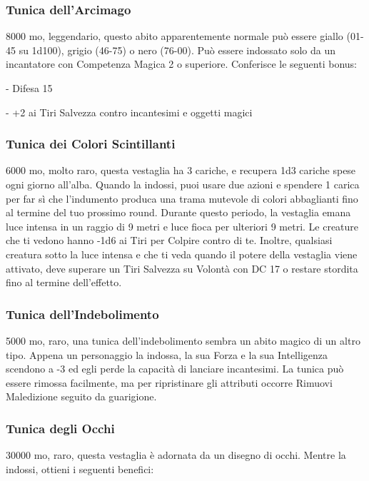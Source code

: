 \begin{multicols}{2}
\subsubsection*{Tunica dell’Arcimago}
8000 mo, leggendario, questo abito apparentemente normale può essere giallo (01-45 su 1d100), grigio (46-75) o nero (76-00). Può essere indossato solo da un incantatore con Competenza Magica 2 o superiore. Conferisce le seguenti bonus:

- Difesa 15

- +2 ai Tiri Salvezza contro incantesimi e oggetti magici

\subsubsection*{Tunica dei Colori Scintillanti}
6000 mo, molto raro, questa vestaglia ha 3 cariche, e recupera 1d3 cariche spese ogni giorno all'alba. Quando la indossi, puoi usare due azioni e spendere 1 carica per far sì che l'indumento produca una trama mutevole di colori abbaglianti fino al termine del tuo prossimo round. Durante questo periodo, la vestaglia emana luce intensa in un raggio di 9 metri e luce fioca per ulteriori 9 metri. Le creature che ti vedono hanno -1d6 ai Tiri per Colpire contro di te. Inoltre, qualsiasi creatura sotto la luce intensa e che ti veda quando il potere della vestaglia viene attivato, deve superare un Tiri Salvezza su Volontà con DC 17 o restare stordita fino al termine dell'effetto.

\subsubsection*{Tunica dell’Indebolimento}
5000 mo, raro, una tunica dell’indebolimento sembra un abito magico di un altro tipo. Appena un personaggio la indossa, la sua Forza e la sua Intelligenza scendono a -3 ed egli perde la capacità di lanciare incantesimi. La tunica può essere rimossa facilmente, ma per ripristinare gli attributi occorre Rimuovi Maledizione seguito da guarigione.

\subsubsection*{Tunica degli Occhi}
30000 mo, raro, questa vestaglia è adornata da un disegno di occhi. Mentre la indossi, ottieni i seguenti benefici:


\end{multicols}
